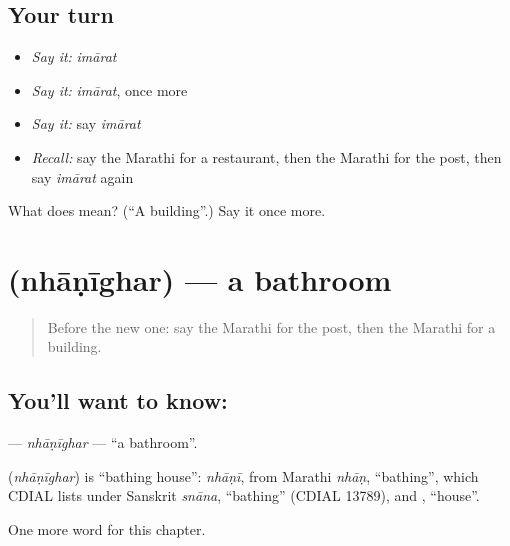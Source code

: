 \subsection*{Your turn}
\begin{itemize}
\raggedright
  \item \emph{Say it:} \emph{imārat}
  \item \emph{Say it:} \emph{imārat}, once more
  \item \emph{Say it:} say \emph{imārat}
  \item \emph{Recall:} say the Marathi for a restaurant, then the Marathi for the post, then say \emph{imārat} again
\end{itemize}

\begin{tcolorbox}[breakable,colback=teal!4,colframe=teal!35!black,title={Before you move on}]
What does  mean? (\textquotedblleft{}A building\textquotedblright{}.) Say it once more.
\end{tcolorbox}
\section[\texorpdfstring{\mr{न्हाणीघर} (nhāṇīghar)}{न्हाणीघर (nhāṇīghar)}]{ (nhāṇīghar) — a bathroom}

\label{lesson:MR-C129-nhanighar}



\begin{quote}
Before the new one: say the Marathi for the post, then the Marathi for a building.
\end{quote}

\subsection*{You'll want to know: }
\textbf{} — \emph{nhāṇīghar} — \textquotedblleft{}a bathroom\textquotedblright{}.

\begin{cousinweb}
\textbf{} (\emph{nhāṇīghar}) is \textquotedblleft{}bathing house\textquotedblright{}: \emph{nhāṇī}, from Marathi \emph{nhāṇ}, \textquotedblleft{}bathing\textquotedblright{}, which CDIAL lists under Sanskrit \emph{snāna}, \textquotedblleft{}bathing\textquotedblright{} (CDIAL 13789), and \textbf{}, \textquotedblleft{}house\textquotedblright{}.
\end{cousinweb}

\begin{grammarlens}[title={What you've built}]
One more word for this chapter.
\end{grammarlens}

